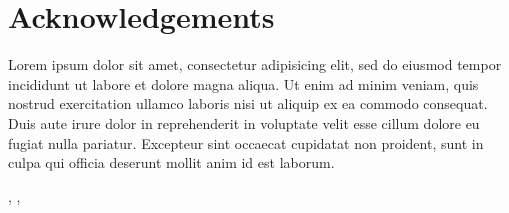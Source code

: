 \thispagestyle{plain}			%
\section*{Acknowledgements}
Lorem ipsum dolor sit amet, consectetur adipisicing elit, sed do eiusmod tempor incididunt ut labore et dolore magna aliqua. Ut enim ad minim veniam, quis nostrud exercitation ullamco laboris nisi ut aliquip ex ea commodo consequat. Duis aute irure dolor in reprehenderit in voluptate velit esse cillum dolore eu fugiat nulla pariatur. Excepteur sint occaecat cupidatat non proident, sunt in culpa qui officia deserunt mollit anim id est laborum.

\hfill
\thesisAuthor, \thesisCity, \thesisMonth\ \thesisYear

\if{}
\newpage				%
\thispagestyle{empty}
\mbox{}
\fi
